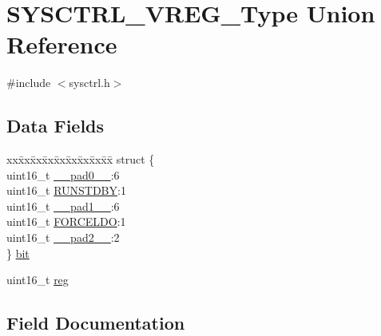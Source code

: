 \hypertarget{union_s_y_s_c_t_r_l___v_r_e_g___type}{}\section{S\+Y\+S\+C\+T\+R\+L\+\_\+\+V\+R\+E\+G\+\_\+\+Type Union Reference}
\label{union_s_y_s_c_t_r_l___v_r_e_g___type}


{\ttfamily \#include $<$sysctrl.\+h$>$}

\subsection*{Data Fields}
\begin{DoxyCompactItemize}
\item 
\begin{tabbing}
xx\=xx\=xx\=xx\=xx\=xx\=xx\=xx\=xx\=\kill
struct \{\\
\>uint16\_t \mbox{\hyperlink{union_s_y_s_c_t_r_l___v_r_e_g___type_a77132c2c26a75f5b8751b235cda23828}{\_\_pad0\_\_}}:6\\
\>uint16\_t \mbox{\hyperlink{union_s_y_s_c_t_r_l___v_r_e_g___type_a0a98954fc108f309f3232355e809617b}{RUNSTDBY}}:1\\
\>uint16\_t \mbox{\hyperlink{union_s_y_s_c_t_r_l___v_r_e_g___type_ab72e3a1f2f7db8695c60c658f5a0f11a}{\_\_pad1\_\_}}:6\\
\>uint16\_t \mbox{\hyperlink{union_s_y_s_c_t_r_l___v_r_e_g___type_add0f40e6eea2c5ccea6c9a1aa846957f}{FORCELDO}}:1\\
\>uint16\_t \mbox{\hyperlink{union_s_y_s_c_t_r_l___v_r_e_g___type_a82701c5ec65a0fca9a84d8edc46a8192}{\_\_pad2\_\_}}:2\\
\} \mbox{\hyperlink{union_s_y_s_c_t_r_l___v_r_e_g___type_a8aa7d08ef62228fe1d160fd857e1c568}{bit}}\\

\end{tabbing}\item 
uint16\+\_\+t \mbox{\hyperlink{union_s_y_s_c_t_r_l___v_r_e_g___type_a11760f5020019f4aa8cb02e694f7cc44}{reg}}
\end{DoxyCompactItemize}


\subsection{Field Documentation}
\mbox{\label{union_s_y_s_c_t_r_l___v_r_e_g___type_a77132c2c26a75f5b8751b235cda23828}} 
